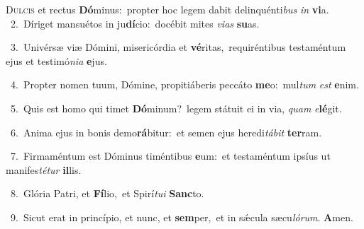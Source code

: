 \lettrine{\initial\textcolor{\initialcolor}{D}}{ulcis} et rectus \textbf{Dó}\-minus:~\star propter hoc legem dabit delinquénti\textit{bus} \textit{in} \textbf{vi}\-a.\\
{\numbfont\textcolor{\numbcolor}{~2.}}~Díriget mansuétos in ju\-\textbf{dí}\-cio:~\star docébit mites \textit{vi}\-\textit{as} \textbf{su}\-as.\par
{\numbfont\textcolor{\numbcolor}{~3.}}~Univérsæ viæ Dómini, misericórdia et \textbf{vé}\-ritas,~\star requiréntibus testaméntum ejus et testimó\-\textit{ni}\-\textit{a} \textbf{e}\-jus.\par
{\numbfont\textcolor{\numbcolor}{~4.}}~Propter nomen tuum, Dómine, propitiáberis peccáto \textbf{me}\-o:~\star mul\textit{tum} \textit{est} \textbf{e}\-nim.\par
{\numbfont\textcolor{\numbcolor}{~5.}}~Quis est homo qui timet \textbf{Dó}\-minum?~\star legem státuit ei in via, \textit{quam} \textit{e}\-\textbf{lé}git.\par
{\numbfont\textcolor{\numbcolor}{~6.}}~Anima ejus in bonis demo\-\textbf{rá}\-bitur:~\star et semen ejus heredi\-\textit{tá}\-\textit{bit} \textbf{ter}\-ram.\par
{\numbfont\textcolor{\numbcolor}{~7.}}~Firmaméntum est Dóminus timéntibus \textbf{e}\-um:~\star et testaméntum ipsíus ut manifes\-\textit{té}\-\textit{tur} \textbf{il}\-lis.\par
{\numbfont\textcolor{\numbcolor}{~8.}}~Glória Patri, et \textbf{Fí}\-lio,~\star et Spirí\-\textit{tu}\-\textit{i} \textbf{Sanc}\-to.\par
{\numbfont\textcolor{\numbcolor}{~9.}}~Sicut erat in princípio, et nunc, et \textbf{sem}\-per,~\star et in sǽcula sæcu\-\textit{ló}\-\textit{rum}. \textbf{A}\-men.\par
